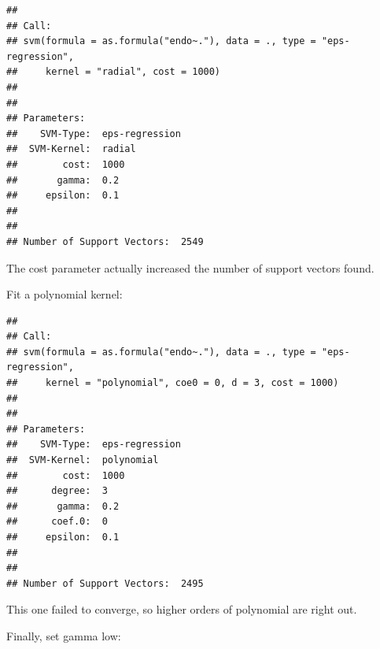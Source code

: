 \documentclass[]{article}
\newenvironment{Shaded}{\begin{snugshade}}{\end{snugshade}}
\newcommand{\KeywordTok}[1]{\textcolor[rgb]{0.13,0.29,0.53}{\textbf{#1}}}
\newcommand{\DataTypeTok}[1]{\textcolor[rgb]{0.13,0.29,0.53}{#1}}
\newcommand{\DecValTok}[1]{\textcolor[rgb]{0.00,0.00,0.81}{#1}}
\newcommand{\StringTok}[1]{\textcolor[rgb]{0.31,0.60,0.02}{#1}}
\newcommand{\CommentTok}[1]{\textcolor[rgb]{0.56,0.35,0.01}{\textit{#1}}}
\newcommand{\OperatorTok}[1]{\textcolor[rgb]{0.81,0.36,0.00}{\textbf{#1}}}
\newcommand{\NormalTok}[1]{#1}
\begin{document}
\begin{verbatim}
## 
## Call:
## svm(formula = as.formula("endo~."), data = ., type = "eps-regression", 
##     kernel = "radial", cost = 1000)
## 
## 
## Parameters:
##    SVM-Type:  eps-regression 
##  SVM-Kernel:  radial 
##        cost:  1000 
##       gamma:  0.2 
##     epsilon:  0.1 
## 
## 
## Number of Support Vectors:  2549
\end{verbatim}

The cost parameter actually increased the number of support vectors
found.

Fit a polynomial kernel:

\begin{Shaded}
\end{Shaded}

\begin{verbatim}
## 
## Call:
## svm(formula = as.formula("endo~."), data = ., type = "eps-regression", 
##     kernel = "polynomial", coe0 = 0, d = 3, cost = 1000)
## 
## 
## Parameters:
##    SVM-Type:  eps-regression 
##  SVM-Kernel:  polynomial 
##        cost:  1000 
##      degree:  3 
##       gamma:  0.2 
##      coef.0:  0 
##     epsilon:  0.1 
## 
## 
## Number of Support Vectors:  2495
\end{verbatim}

This one failed to converge, so higher orders of polynomial are right
out.

Finally, set gamma low:
\end{document}
